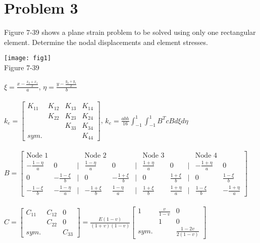 \documentclass{article}
\begin{document}
\section*{Problem 3}
Figure 7-39 shows a plane strain problem to be solved using only one rectangular element.
Determine the nodal displacements and element stresses. \\
\begin{center}
    \texttt{[image: fig1]} \\ Figure 7-39
\end{center}
$\xi=\frac{x-\frac{x_2+x_1}{2}}{a}$, \quad $\eta=\frac{y-\frac{y_2+y_1}{2}}{b}$ \\\\
$k_e=\begin{bmatrix}
    K_{11} & K_{12} & K_{13} & K_{14} \\
    & K_{22} & K_{23} & K_{24} \\
    & & K_{33} & K_{34} \\
    sym. & & & K_{44}
\end{bmatrix}$, \quad $k_e=\frac{abh}{16}\int_{-1}^{1}\int_{-1}^{1}B^TcBd\xi d\eta$ \\\\
$B=\begin{bmatrix}
    \textrm{Node 1} & & & \textrm{Node 2} & & & \textrm{Node 3} & & & \textrm{Node 4}\\
    \hline
    -\frac{1-\eta}{a} & 0 & | & \frac{1-\eta}{a} & 0 & | & \frac{1+\eta}{a} & 0 & |
    & -\frac{1+\eta}{a} & 0 \\
    0 & -\frac{1-\xi}{b} & | & 0 & -\frac{1+\xi}{b} & | & 0 & \frac{1+\xi}{b} & | & 0 &
    \frac{1-\xi}{b} \\
    -\frac{1-\xi}{b} & -\frac{1-\eta}{a} & | & -\frac{1+\xi}{b} & \frac{1-\eta}{a} & | & 
    \frac{1+\xi}{b} & \frac{1+\eta}{a} & | & \frac{1-\xi}{b} & -\frac{1+\eta}{a}
\end{bmatrix}$ \\\\
$C=\begin{bmatrix}
    C_{11} & C_{12} & 0 \\
    & C_{22} & 0 \\
    sym. & & C_{33}
\end{bmatrix}=\frac{E(1-v)}{(1+v)(1-v)}\begin{bmatrix}
    1 & \frac{v}{1-v} & 0 \\
    & 1 & 0 \\
    sym. & & \frac{1-2v}{2(1-v)}
\end{bmatrix}$ \\\\
\end{document}
